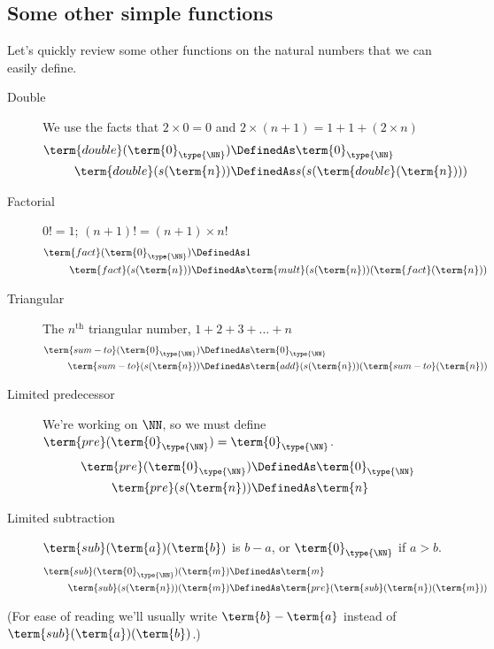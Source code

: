 \subsection{Some other simple functions}
\label{sec:NaturalNumbers-OtherFunctions}

Let's quickly review some other functions on the natural numbers that we can easily define.
\begin{description}
\item[Double] We use the facts that $2\times 0 = 0$ and $2\times (n+1) = 1+1+(2\times n)$
\begin{align*}
\term{double}(\term{0}_{\type{\NN}}) 
&\DefinedAs 
\term{0}_{\type{\NN}}
\\
\term{double}(s(\term{n})) 
&\DefinedAs
s(s(\term{double}(\term{n})))
\end{align*}
%
\item[Factorial]  $0! = 1$; $(n+1)! = (n+1) \times n!$
\begin{align*}
\term{fact}(\term{0}_{\type{\NN}}) 
&\DefinedAs 
1\\
\term{fact}(s(\term{n})) 
&\DefinedAs
\term{mult}(s(\term{n}))(\term{fact}(\term{n}))
\end{align*}
%
\item[Triangular] The $n^{\mbox{th}}$ triangular number, $1+2+3+ \ldots +n$
\begin{align*}
\term{sum-to}(\term{0}_{\type{\NN}}) 
&\DefinedAs 
\term{0}_{\type{\NN}}
\\
\term{sum-to}(s(\term{n})) 
&\DefinedAs
\term{add}(s(\term{n}))(\term{sum-to}(\term{n}))
\end{align*}
%



\item[Limited predecessor]  We're working on $\NN$, so we must define $\term{pre}(\term{0}_{\type{\NN}})  = \term{0}_{\type{\NN}}$.
 \begin{align*}
\term{pre}(\term{0}_{\type{\NN}}) 
&\DefinedAs 
\term{0}_{\type{\NN}}
\\
\term{pre}(s(\term{n})) 
&\DefinedAs
\term{n}
\end{align*}
%
\item[Limited subtraction]  $\term{sub}(\term{a})(\term{b})$ is $b-a$, or $\term{0}_{\type{\NN}}$ if $a > b$.
 \begin{align*}
\term{sub}(\term{0}_{\type{\NN}})(\term{m}) &\DefinedAs 
\term{m}
\\
\term{sub}(s(\term{n}))(\term{m}) &\DefinedAs
\term{pre}(\term{sub}(\term{n})(\term{m}))
\end{align*}
\end{description}
(For ease of reading we'll usually write $\term{b} - \term{a}$ instead of $\term{sub}(\term{a})(\term{b})$.)


